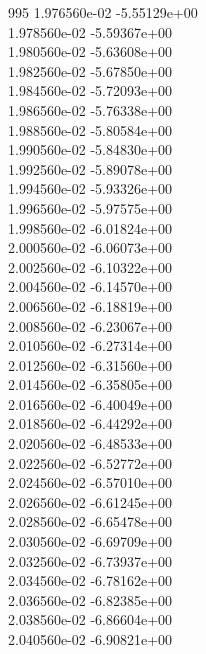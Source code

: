 995	1.976560e-02	-5.55129e+00	\\ 	1.978560e-02	-5.59367e+00	\\ 	1.980560e-02	-5.63608e+00	\\ 	1.982560e-02	-5.67850e+00	\\ 	1.984560e-02	-5.72093e+00	\\ 	1.986560e-02	-5.76338e+00	\\ 	1.988560e-02	-5.80584e+00	\\ 	1.990560e-02	-5.84830e+00	\\ 	1.992560e-02	-5.89078e+00	\\ 	1.994560e-02	-5.93326e+00	\\ 	1.996560e-02	-5.97575e+00	\\ 	1.998560e-02	-6.01824e+00	\\ 	2.000560e-02	-6.06073e+00	\\ 	2.002560e-02	-6.10322e+00	\\ 	2.004560e-02	-6.14570e+00	\\ 	2.006560e-02	-6.18819e+00	\\ 	2.008560e-02	-6.23067e+00	\\ 	2.010560e-02	-6.27314e+00	\\ 	2.012560e-02	-6.31560e+00	\\ 	2.014560e-02	-6.35805e+00	\\ 	2.016560e-02	-6.40049e+00	\\ 	2.018560e-02	-6.44292e+00	\\ 	2.020560e-02	-6.48533e+00	\\ 	2.022560e-02	-6.52772e+00	\\ 	2.024560e-02	-6.57010e+00	\\ 	2.026560e-02	-6.61245e+00	\\ 	2.028560e-02	-6.65478e+00	\\ 	2.030560e-02	-6.69709e+00	\\ 	2.032560e-02	-6.73937e+00	\\ 	2.034560e-02	-6.78162e+00	\\ 	2.036560e-02	-6.82385e+00	\\ 	2.038560e-02	-6.86604e+00	\\ 	2.040560e-02	-6.90821e+00	\\ \hline
